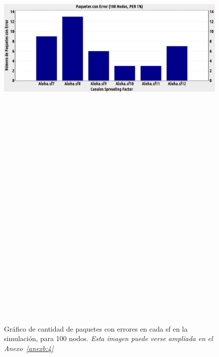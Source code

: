 \begin{justify}
\noindent
\begin{figure}[!ht]
\centering
\includegraphics[width=13cm,height=30cm,keepaspectratio]{images/errores100nodos.eps}
\caption{Gráfico de cantidad de paquetes con errores en cada \gls{sf} en la simulación, para 100 nodos. \textit{Esta imagen puede verse ampliada en el Anexo~\ref{anexb:4}}}
\label{prueba:5}
\end{figure}
\end{justify}